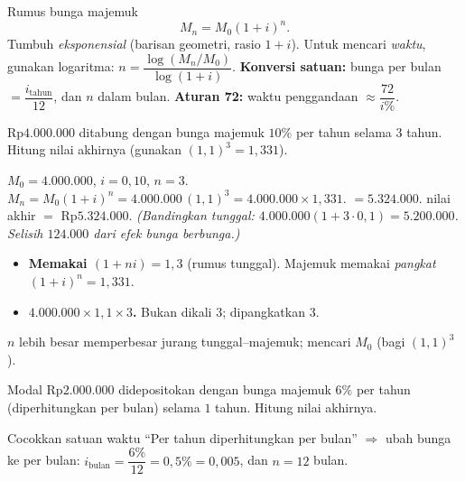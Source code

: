 \begin{ingat}{Rumus bunga majemuk}
\[
M_n=M_0(1+i)^n.
\]
Tumbuh \emph{eksponensial} (barisan geometri, rasio $1+i$). Untuk mencari
\emph{waktu}, gunakan logaritma: $n=\dfrac{\log(M_n/M_0)}{\log(1+i)}$.
\textbf{Konversi satuan:} bunga per bulan $=\dfrac{i_\text{tahun}}{12}$, dan $n$
dalam bulan. \textbf{Aturan 72:} waktu penggandaan $\approx\dfrac{72}{i\%}$.
\end{ingat}

\begin{soalbox}{}
Rp$4.000.000$ ditabung dengan bunga majemuk $10\%$ per tahun selama $3$ tahun.
Hitung nilai akhirnya (gunakan $(1{,}1)^3=1{,}331$).
\end{soalbox}

\jawab
{} $M_0=4.000.000$, $i=0{,}10$, $n=3$.
 $M_n=M_0(1+i)^n=4.000.000\,(1{,}1)^3=4.000.000\times1{,}331$.
 $=5.324.000$.
\jadi nilai akhir $=$ Rp$5.324.000$.
\emph{(Bandingkan tunggal: $4.000.000(1+3\cdot0{,}1)=5.200.000$. Selisih
$124.000$ dari efek bunga berbunga.)}

\begin{jebakan}
\begin{itemize}[leftmargin=*,topsep=2pt]
  \item \textbf{Memakai $(1+ni)=1{,}3$} (rumus tunggal). Majemuk memakai
  \emph{pangkat} $(1+i)^n=1{,}331$.
  \item \textbf{$4.000.000\times1{,}1\times3$.} Bukan dikali $3$; dipangkatkan
  $3$.
\end{itemize}
\end{jebakan}

\begin{variasi}
$n$ lebih besar memperbesar jurang tunggal--majemuk; mencari $M_0$ (bagi
$(1{,}1)^3$).
\end{variasi}

\begin{soalbox}{}
Modal Rp$2.000.000$ didepositokan dengan bunga majemuk $6\%$ per tahun
(diperhitungkan per bulan) selama $1$ tahun. Hitung nilai akhirnya.
\end{soalbox}

\begin{ingat}{Cocokkan satuan waktu}
``Per tahun diperhitungkan per bulan'' $\Rightarrow$ ubah bunga ke per bulan:
$i_\text{bulan}=\dfrac{6\%}{12}=0{,}5\%=0{,}005$, dan $n=12$ bulan.
\end{ingat}

